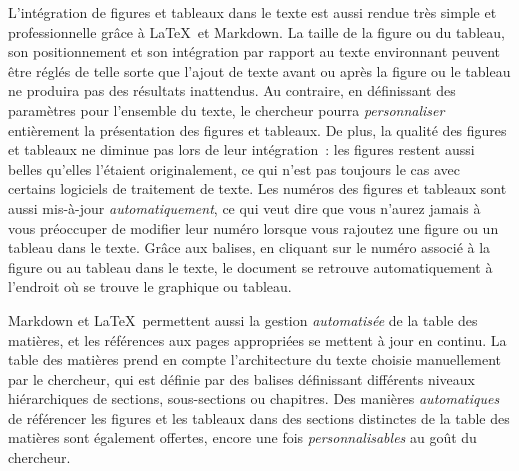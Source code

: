 \documentclass[
  letterpaper,
]{scrbook}
\begin{document}
L'intégration de figures et tableaux dans le texte est aussi rendue très
simple et professionnelle grâce à \LaTeX~et Markdown. La taille de la
figure ou du tableau, son positionnement et son intégration par rapport
au texte environnant peuvent être réglés de telle sorte que l'ajout de
texte avant ou après la figure ou le tableau ne produira pas des
résultats inattendus. Au contraire, en définissant des paramètres pour
l'ensemble du texte, le chercheur pourra \emph{personnaliser}
entièrement la présentation des figures et tableaux. De plus, la qualité
des figures et tableaux ne diminue pas lors de leur intégration~: les
figures restent aussi belles qu'elles l'étaient originalement, ce qui
n'est pas toujours le cas avec certains logiciels de traitement de
texte. Les numéros des figures et tableaux sont aussi mis-à-jour
\emph{automatiquement}, ce qui veut dire que vous n'aurez jamais à vous
préoccuper de modifier leur numéro lorsque vous rajoutez une figure ou
un tableau dans le texte. Grâce aux balises, en cliquant sur le numéro
associé à la figure ou au tableau dans le texte, le document se retrouve
automatiquement à l'endroit où se trouve le graphique ou tableau.

Markdown et \LaTeX~permettent aussi la gestion \emph{automatisée} de la
table des matières, et les références aux pages appropriées se mettent à
jour en continu. La table des matières prend en compte l'architecture du
texte choisie manuellement par le chercheur, qui est définie par des
balises définissant différents niveaux hiérarchiques de sections,
sous-sections ou chapitres. Des manières \emph{automatiques} de
référencer les figures et les tableaux dans des sections distinctes de
la table des matières sont également offertes, encore une fois
\emph{personnalisables} au goût du chercheur.
\end{document}
